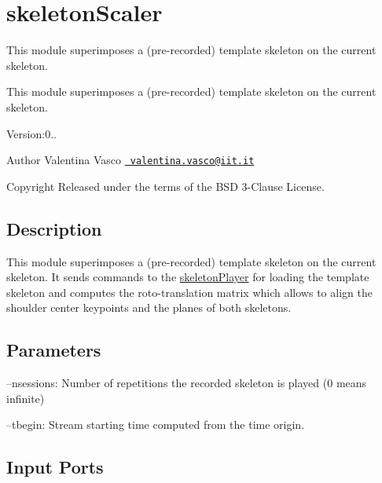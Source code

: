 \section{skeleton\+Scaler}
\label{group__skeletonScaler}


This module superimposes a (pre-\/recorded) template skeleton on the current skeleton.  


This module superimposes a (pre-\/recorded) template skeleton on the current skeleton. 

Version\+:0.. \begin{DoxyAuthor}{Author}
Valentina Vasco \href{mailto:valentina.vasco@iit.it}{\texttt{ valentina.\+vasco@iit.\+it}} ~\newline
 
\end{DoxyAuthor}
\begin{DoxyCopyright}{Copyright}
Released under the terms of the B\+SD 3-\/Clause License. 
\end{DoxyCopyright}
\hypertarget{group__skeletonViewer_intro_sec}{}\subsection{Description}\label{group__skeletonViewer_intro_sec}
This module superimposes a (pre-\/recorded) template skeleton on the current skeleton. It sends commands to the \mbox{\hyperlink{group__skeletonPlayer}{skeleton\+Player}} for loading the template skeleton and computes the roto-\/translation matrix which allows to align the shoulder center keypoints and the planes of both skeletons.\hypertarget{group__skeletonViewer_parameters_sec}{}\subsection{Parameters}\label{group__skeletonViewer_parameters_sec}

\begin{DoxyItemize}
\item --nsessions\+: Number of repetitions the recorded skeleton is played (0 means infinite)
\item --tbegin\+: Stream starting time computed from the time origin. 
\end{DoxyItemize}\hypertarget{group__skeletonViewer_inputports_sec}{}\subsection{Input Ports}\label{group__skeletonViewer_inputports_sec}

